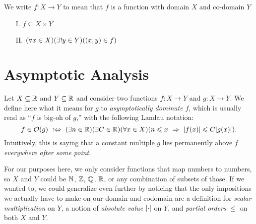 \begin{definition}[Function]
    We write $f: X \to Y$ to mean that $f$ is a function with domain $X$ and co-domain $Y$ \iffbydefn
    \begin{enumerate}
        \item[I.]
            $f \subseteq X \times Y$
        \item[II.]
            $\pn*{\forall x \in X}\pn*{\exists ! y \in Y}\pn*{(x, y) \in f}$
    \end{enumerate}
\end{definition}

\section{Asymptotic Analysis}
\begin{definition}
    Let $X \subseteq \mathbb{R}$ and $Y \subseteq \mathbb{R}$ and consider two functions $f: X \to Y$ and $g: X \to Y$.
    We define here what it means for $g$ to \emph{asymptotically dominate} $f$,
    which is usually read as ``$f$ is big-oh of $g$,''
    with the following Landau notation:
    \[
        f \in \O{g} \iffdefn \pn*{\exists n \in \R}\pn*{\exists C \in \R}\pn*{\forall x \in X}
                             \pn*{n \leq x \implies \abs{f(x)} \leq C \abs{g(x)}}.
    \]
    Intuitively, this is saying that a constant multiple $g$ lies permanently above $f$
    \emph{everywhere after some point}.

    For our purposes here, we only consider functions that map numbers to numbers,
    so $X$ and $Y$ could be $\mathbb{N}$, $\mathbb{Z}$, $\mathbb{Q}$, $\mathbb{R}$, or any combination of subsets of those.
    If we wanted to, we could generalize even further by noticing that
    the only impositions we actually have to make on our domain and codomain are
    a definition for \emph{scalar multiplication} on $Y$,
    a notion of \emph{absolute value} $\lvert\cdot\rvert$ on $Y$,
    and \emph{partial orders} $\leq$ on both $X$ and $Y$.
\end{definition}


